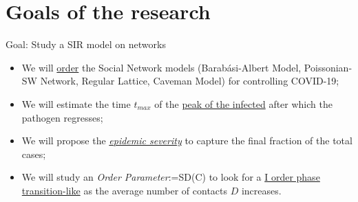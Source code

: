 \documentclass[xcolor={dvipsnames}, aspectratio = 43]{beamer}
\begin{document}
\section{Goals of the research}
\begin{frame}{Goal: Study a SIR model on networks}
\centering
\begin{itemize}
	\item We will \underline{order} the Social Network models (Barabási-Albert Model, Poissonian-SW Network, Regular Lattice, Caveman Model) for controlling COVID-19; \vfill
	\item We will estimate the time $t_{max}$ of the \underline{peak of the infected} after which the pathogen regresses; \vfill
	\item We will propose the \underline{\textit{epidemic severity}} to capture the final fraction of the total cases; \vfill
	\item We will study an \textit{Order Parameter}:=SD(C) \cite{Thurner::NetBasedExpl} to look for a \underline{I order phase transition-like} as the average number of contacts $ D$ increases. \vfill
\end{itemize}
\end{frame}
\end{document}
